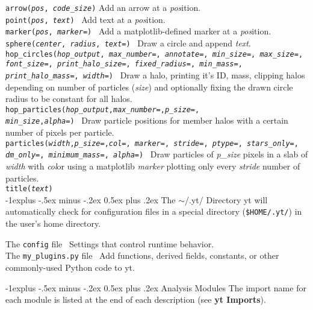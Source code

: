 \documentclass[10pt,landscape]{article}
\makeatletter
\renewcommand{\subsection}{\@startsection{subsection}{2}{0mm}%
                                {-1explus -.5ex minus -.2ex}%
                                {0.5ex plus .2ex}%
                                {\normalfont\normalsize\bfseries}}
\makeatother
\begin{document}
\begin{multicols}{3}
\texttt{arrow({\it pos}, {\it code\_size})} Add an arrow at a {\it pos}ition. \\
\texttt{point({\it pos}, {\it text})} \textemdash\ Add text at a {\it pos}ition. \\
\texttt{marker({\it pos}, {\it marker=})} \textemdash\ Add a matplotlib-defined marker at a {\it pos}ition. \\
\texttt{sphere({\it center}, {\it radius}, {\it text=})} \textemdash\ Draw a circle and append {\it text}.\\
\texttt{hop\_circles({\it hop\_output}, {\it max\_number=}, {\it annotate=}, {\it min\_size=}, {\it max\_size=}, {\it font\_size=}, {\it print\_halo\_size=}, {\it fixed\_radius=}, {\it min\_mass=}, {\it print\_halo\_mass=}, {\it width=})} \textemdash\ Draw a halo, printing it's ID, mass, clipping halos depending on number of particles ({\it size}) and optionally fixing the drawn circle radius to be constant for all halos.\\
\texttt{hop\_particles({\it hop\_output},{\it max\_number=},{\it p\_size=},\\
{\it min\_size},{\it alpha=})} \textemdash\ Draw particle positions for member halos with a certain number of pixels per particle.\\
\texttt{particles({\it width},{\it p\_size=},{\it col=}, {\it marker=}, {\it stride=}, {\it ptype=}, {\it stars\_only=}, {\it dm\_only=}, {\it minimum\_mass=}, {\it alpha=})}  \textemdash\  Draw particles of {\it p\_size} pixels in a slab of {\it width} with {\it col}or using a matplotlib {\it marker} plotting only every {\it stride} number of particles.\\
\texttt{title({\it text})}\\

\subsection{The $\sim$/.yt/ Directory}
yt will automatically check for configuration files in a special directory (\texttt{\$HOME/.yt/}) in the user's home directory.

The \texttt{config} file \textemdash\ Settings that control runtime behavior. \\
The \texttt{my\_plugins.py} file \textemdash\ Add functions, derived fields, constants, or other commonly-used Python code to yt.




\subsection{Analysis Modules}
The import name for each module is listed at the end of each description (see \textbf{yt Imports}).


\end{multicols}
\end{document}
